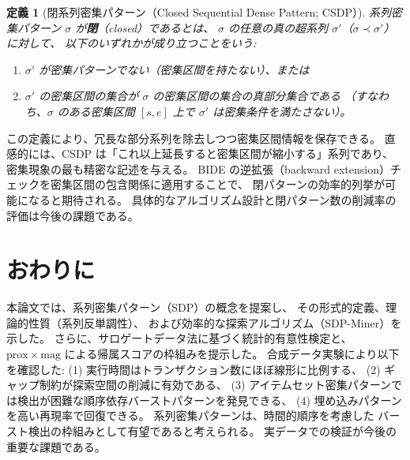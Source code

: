 \documentclass[11pt,a4paper]{article}
\newtheorem{definition}{定義}[section]
\begin{document}
\begin{definition}[閉系列密集パターン（Closed Sequential Dense Pattern; CSDP）]
\label{def:csdp}
系列密集パターン $\sigma$ が\textbf{閉}（closed）であるとは、
$\sigma$ の任意の真の超系列 $\sigma'$（$\sigma \prec \sigma'$）に対して、
以下のいずれかが成り立つことをいう:
\begin{enumerate}[leftmargin=1.5em]
  \item $\sigma'$ が密集パターンでない（密集区間を持たない）、または
  \item $\sigma'$ の密集区間の集合が $\sigma$ の密集区間の集合の真部分集合である
        （すなわち、$\sigma$ のある密集区間 $[s,e]$ 上で
        $\sigma'$ は密集条件を満たさない）。
\end{enumerate}
\end{definition}

\noindent
この定義により、冗長な部分系列を除去しつつ密集区間情報を保存できる。
直感的には、CSDP は「これ以上延長すると密集区間が縮小する」系列であり、
密集現象の最も精密な記述を与える。
BIDE の逆拡張（backward extension）チェックを密集区間の包含関係に適用することで、
閉パターンの効率的列挙が可能になると期待される。
具体的なアルゴリズム設計と閉パターン数の削減率の評価は今後の課題である。

\section{おわりに}
\label{sec:conclusion}

本論文では、系列密集パターン（SDP）の概念を提案し、
その形式的定義、理論的性質（系列反単調性）、
および効率的な探索アルゴリズム（SDP-Miner）を示した。
さらに、サロゲートデータ法に基づく統計的有意性検定と、
$\mathrm{prox} \times \mathrm{mag}$ による帰属スコアの枠組みを提示した。
合成データ実験により以下を確認した:
(1) 実行時間はトランザクション数にほぼ線形に比例する、
(2) ギャップ制約が探索空間の削減に有効である、
(3) アイテムセット密集パターンでは検出が困難な順序依存バーストパターンを発見できる、
(4) 埋め込みパターンを高い再現率で回復できる。
系列密集パターンは、時間的順序を考慮した
バースト検出の枠組みとして有望であると考えられる。
実データでの検証が今後の重要な課題である。

\end{document}
